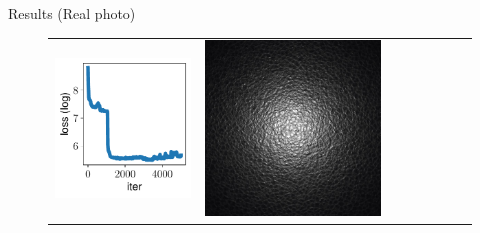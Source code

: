 \documentclass[final]{beamer}
\newlength{\twocolwid}
\newlength{\resultwidth}
\begin{document}
\begin{frame}[t]
\begin{columns}[t]
\begin{column}{\twocolwid}
\begin{block}{Results (Real photo)}
\begin{figure}[t]
\begin{tabular}{ccrclccc}
            		\includegraphics[width=\resultwidth]{images/real/leather/loss.pdf} &
            		\includegraphics[width=\resultwidth]{images/real/leather/optim.jpg} &

\end{tabular}
\end{figure}
\end{block}
\end{column}
\end{columns}
\end{frame}
\end{document}
